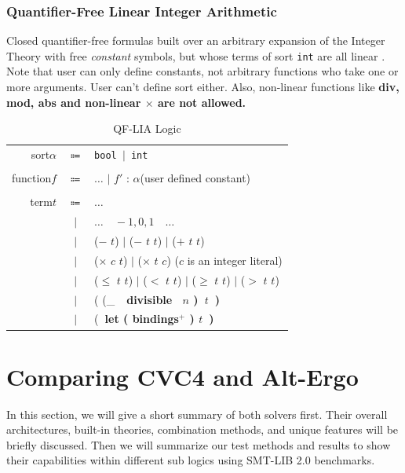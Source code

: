 \documentclass[10pt,letter]{article}
\theoremstyle{definition}
\begin{document}
\subsubsection{Quantifier-Free Linear Integer Arithmetic}
Closed quantifier-free formulas built over an arbitrary expansion of the
Integer Theory with free {\it constant} symbols, but whose terms of sort {\tt int}
are all linear \cite{bs2010}. Note that user can only define constants, not arbitrary functions who take one or more arguments. User can't define sort either. Also, non-linear functions like \bf div\rm, \bf mod\rm, \bf abs \rm and non-linear $\times$ are not allowed.

\begin{table}[!h]
\begin{mdframed}
\centering
\begin{tabular}{r c l}
sort\qquad $\alpha$ & $\Coloneqq$ & \tt bool $\mid$ int\\
\\
function\qquad $f$ & $\Coloneqq$ & $\ldots$ $\mid$ \rm $f'$ : $\alpha$\qquad(user defined constant)\\
\\
term\qquad $t$ & $\Coloneqq$ & $\ldots$ \\
& $\mid$ & $\ldots\quad-1,0,1\quad\ldots$\\
& $\mid$ & ($-$ $t$) $\mid$ ($-$ $t$ $t$) $\mid$ ($+$ $t$ $t$) \\
& $\mid$ & ($\times$ $c$ $t$) $\mid$ ($\times$ $t$ $c$) \qquad($c$ is an integer literal)\\
& $\mid$ & ($\leqslant$ $t$ $t$) $\mid$ ($<$ $t$ $t$) $\mid$ ($\geqslant$ $t$ $t$) $\mid$ ($>$ $t$ $t$)\\
& $\mid$ & ( (_\ \bf\ divisible \rm\ $n$ )\ $t$\ )\\
& $\mid$ & (\bf\ let \rm ( bindings$^+$ ) $t$\ )\\

\end{tabular}
\end{mdframed}
\caption{QF-LIA Logic}
\end{table}

\section{Comparing CVC4 and Alt-Ergo}

In this section, we will give a short summary of both solvers first. Their overall architectures, built-in theories, combination methods, and unique features will be briefly discussed. Then we will summarize our test methods and results to show their capabilities within different sub logics using SMT-LIB 2.0 benchmarks.
\end{document}
